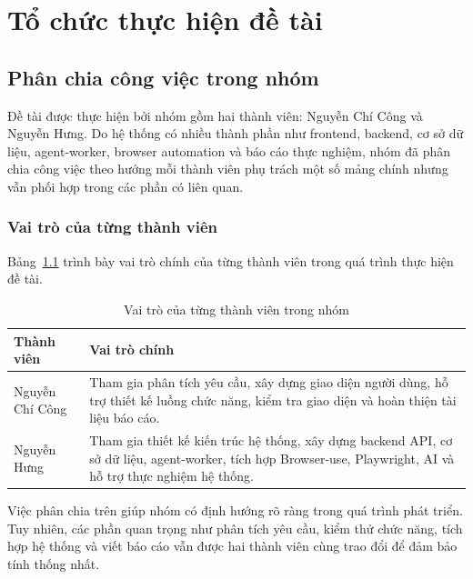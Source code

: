 
\chapter{Tổ chức thực hiện đề tài}
\label{Chapter7}

\section{Phân chia công việc trong nhóm}

Đề tài được thực hiện bởi nhóm gồm hai thành viên: Nguyễn Chí Công và Nguyễn Hưng. Do hệ thống có nhiều thành phần như frontend, backend, cơ sở dữ liệu, agent-worker, browser automation và báo cáo thực nghiệm, nhóm đã phân chia công việc theo hướng mỗi thành viên phụ trách một số mảng chính nhưng vẫn phối hợp trong các phần có liên quan.

\subsection{Vai trò của từng thành viên}

Bảng~\ref{tab:chapter7_member_roles} trình bày vai trò chính của từng thành viên trong quá trình thực hiện đề tài.

\begin{table}[H]
\centering
\caption{Vai trò của từng thành viên trong nhóm}
\label{tab:chapter7_member_roles}
\renewcommand{\arraystretch}{1.2}
\begin{tabular}{|p{4.0cm}|p{10.2cm}|}
\hline
\textbf{Thành viên} & \textbf{Vai trò chính} \\
\hline
Nguyễn Chí Công & Tham gia phân tích yêu cầu, xây dựng giao diện người dùng, hỗ trợ thiết kế luồng chức năng, kiểm tra giao diện và hoàn thiện tài liệu báo cáo. \\
\hline
Nguyễn Hưng & Tham gia thiết kế kiến trúc hệ thống, xây dựng backend API, cơ sở dữ liệu, agent-worker, tích hợp Browser-use, Playwright, AI và hỗ trợ thực nghiệm hệ thống. \\
\hline
\end{tabular}
\end{table}

Việc phân chia trên giúp nhóm có định hướng rõ ràng trong quá trình phát triển. Tuy nhiên, các phần quan trọng như phân tích yêu cầu, kiểm thử chức năng, tích hợp hệ thống và viết báo cáo vẫn được hai thành viên cùng trao đổi để đảm bảo tính thống nhất.

